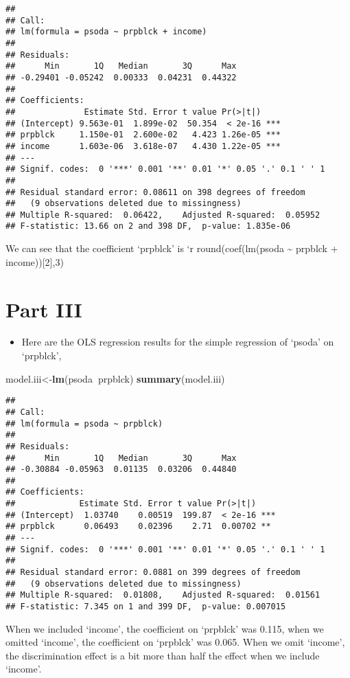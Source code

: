 \documentclass[]{article}
\newenvironment{Shaded}{\begin{snugshade}}{\end{snugshade}}
\newcommand{\KeywordTok}[1]{\textcolor[rgb]{0.13,0.29,0.53}{\textbf{#1}}}
\newcommand{\OperatorTok}[1]{\textcolor[rgb]{0.81,0.36,0.00}{\textbf{#1}}}
\newcommand{\NormalTok}[1]{#1}
\providecommand{\tightlist}{%
  \setlength{\itemsep}{0pt}\setlength{\parskip}{0pt}}
\begin{document}
\begin{verbatim}
## 
## Call:
## lm(formula = psoda ~ prpblck + income)
## 
## Residuals:
##      Min       1Q   Median       3Q      Max 
## -0.29401 -0.05242  0.00333  0.04231  0.44322 
## 
## Coefficients:
##              Estimate Std. Error t value Pr(>|t|)    
## (Intercept) 9.563e-01  1.899e-02  50.354  < 2e-16 ***
## prpblck     1.150e-01  2.600e-02   4.423 1.26e-05 ***
## income      1.603e-06  3.618e-07   4.430 1.22e-05 ***
## ---
## Signif. codes:  0 '***' 0.001 '**' 0.01 '*' 0.05 '.' 0.1 ' ' 1
## 
## Residual standard error: 0.08611 on 398 degrees of freedom
##   (9 observations deleted due to missingness)
## Multiple R-squared:  0.06422,    Adjusted R-squared:  0.05952 
## F-statistic: 13.66 on 2 and 398 DF,  p-value: 1.835e-06
\end{verbatim}

We can see that the coefficient `prpblck' is `r round(coef(lm(psoda
\textasciitilde{} prpblck + income)){[}2{]},3)

\section{Part III}\label{part-iii}

\begin{itemize}
\tightlist
\item
  Here are the OLS regression results for the simple regression of
  `psoda' on `prpblck',
\end{itemize}

\begin{Shaded}
\begin{Highlighting}[]
\NormalTok{model.iii<-}\KeywordTok{lm}\NormalTok{(psoda}\OperatorTok{~}\NormalTok{prpblck)}
\KeywordTok{summary}\NormalTok{(model.iii)}
\end{Highlighting}
\end{Shaded}

\begin{verbatim}
## 
## Call:
## lm(formula = psoda ~ prpblck)
## 
## Residuals:
##      Min       1Q   Median       3Q      Max 
## -0.30884 -0.05963  0.01135  0.03206  0.44840 
## 
## Coefficients:
##             Estimate Std. Error t value Pr(>|t|)    
## (Intercept)  1.03740    0.00519  199.87  < 2e-16 ***
## prpblck      0.06493    0.02396    2.71  0.00702 ** 
## ---
## Signif. codes:  0 '***' 0.001 '**' 0.01 '*' 0.05 '.' 0.1 ' ' 1
## 
## Residual standard error: 0.0881 on 399 degrees of freedom
##   (9 observations deleted due to missingness)
## Multiple R-squared:  0.01808,    Adjusted R-squared:  0.01561 
## F-statistic: 7.345 on 1 and 399 DF,  p-value: 0.007015
\end{verbatim}

When we included `income', the coefficient on `prpblck' was 0.115, when
we omitted `income', the coefficient on `prpblck' was 0.065. When we
omit `income', the discrimination effect is a bit more than half the
effect when we include `income'.
\end{document}
